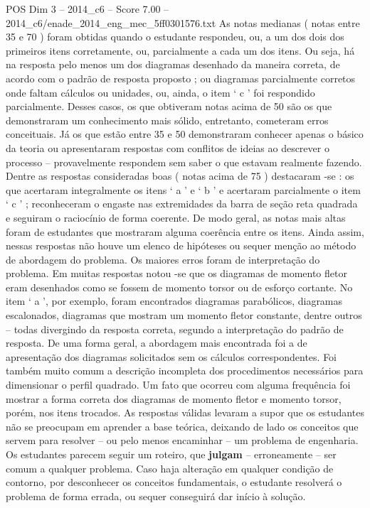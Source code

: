 \begin{textsample}{POS Dim 3 – 2014\_c6 – Score 7.00 – 2014\_c6/enade\_2014\_eng\_mec\_5ff0301576.txt}
As notas medianas ( notas entre 35 e 70 ) foram obtidas quando o estudante respondeu, ou, a um dos dois dos primeiros itens corretamente, ou, parcialmente a cada um dos itens.
Ou seja, há na resposta pelo menos um dos diagramas desenhado da maneira correta, de acordo com o padrão de resposta proposto ; ou diagramas parcialmente corretos onde faltam cálculos ou unidades, ou, ainda, o item ‘ c ’ foi respondido parcialmente.
Desses casos, os que obtiveram notas acima de 50 são os que demonstraram um conhecimento mais sólido, entretanto, cometeram erros conceituais.
Já os que estão entre 35 e 50 demonstraram conhecer apenas o básico da teoria ou apresentaram respostas com conflitos de ideias ao descrever o processo – provavelmente respondem sem saber o que estavam realmente fazendo.
Dentre as respostas consideradas boas ( notas acima de 75 ) destacaram -se : os que acertaram integralmente os itens ‘ a ’ e ‘ b ’ e acertaram parcialmente o item ‘ c ’ ; reconheceram o engaste nas extremidades da barra de seção reta quadrada e seguiram o raciocínio de forma coerente.
De modo geral, as notas mais altas foram de estudantes que mostraram alguma coerência entre os itens.
Ainda assim, nessas respostas não houve um elenco de hipóteses ou sequer menção ao método de abordagem do problema.
Os maiores erros foram de interpretação do problema.
Em muitas respostas notou -se que os diagramas de momento fletor eram desenhados como se fossem de momento torsor ou de esforço cortante.
No item ‘ a ’, por exemplo, foram encontrados diagramas parabólicos, diagramas escalonados, diagramas que mostram um momento fletor constante, dentre outros – todas divergindo da resposta correta, segundo a interpretação do padrão de resposta.
De uma forma geral, a abordagem mais encontrada foi a de apresentação dos diagramas solicitados sem os cálculos correspondentes.
Foi também muito comum a descrição incompleta dos procedimentos necessários para dimensionar o perfil quadrado.
Um fato que ocorreu com alguma frequência foi mostrar a forma correta dos diagramas de momento fletor e momento torsor, porém, nos itens trocados.
As respostas válidas levaram a supor que os estudantes não se preocupam em aprender a base teórica, deixando de lado os conceitos que servem para resolver – ou pelo menos encaminhar – um problema de engenharia.
Os estudantes parecem seguir um roteiro, que \textbf{julgam} – erroneamente – ser comum a qualquer problema.
Caso haja alteração em qualquer condição de contorno, por desconhecer os conceitos fundamentais, o estudante resolverá o problema de forma errada, ou sequer conseguirá dar início à solução.

\end{textsample}
